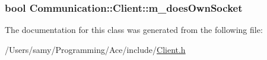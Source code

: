 \subsubsection[{m\+\_\+does\+Own\+Socket}]{\setlength{\rightskip}{0pt plus 5cm}bool Communication\+::\+Client\+::m\+\_\+does\+Own\+Socket\hspace{0.3cm}{\ttfamily [private]}}\label{class_communication_1_1_client_afe0f1b2c58ad4ec8a0b2fb74e3a59b08}


The documentation for this class was generated from the following file\+:\begin{DoxyCompactItemize}
\item 
/\+Users/samy/\+Programming/\+Ace/include/\hyperlink{_client_8h}{Client.\+h}\end{DoxyCompactItemize}
